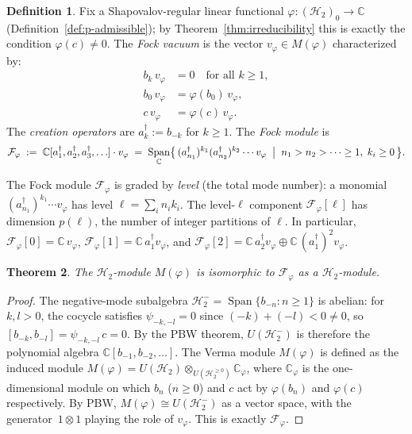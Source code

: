 \documentclass[12pt]{amsart}
\theoremstyle{plain}
\newtheorem{theorem}{Theorem}[section]
\theoremstyle{definition}
\newtheorem{definition}[theorem]{Definition}
\newcommand{\CC}{\mathbb{C}}
\newcommand{\Mf}{M(\varphi)}          %
\newcommand{\vf}{v_\varphi}           %
\DeclareMathOperator{\Span}{Span}
\begin{document}
\begin{definition}
\label{def:fock-vacuum}
Fix a Shapovalov-regular linear functional
$\varphi\colon (\mathcal{H}_2)_0 \to \CC$
(Definition~\ref{def:p-admissible}); by
Theorem~\ref{thm:irreducibility} this is exactly the condition
$\varphi(c)\neq 0$.
The \emph{Fock vacuum} is the vector $\vf \in \Mf$ characterized by:
\begin{align}
  b_k\, \vf &= 0 \quad \text{for all } k \geq 1, \label{eq:fock-annihilate} \\
  b_0\, \vf &= \varphi(b_0)\,\vf, \label{eq:fock-zero-mode} \\
  c\, \vf   &= \varphi(c)\,\vf. \label{eq:fock-central}
\end{align}
The \emph{creation operators} are $a_k^\dagger := b_{-k}$ for $k \geq 1$.
The \emph{Fock module} is
\[
  \mathcal{F}_\varphi
  \;:=\;
  \CC[a_1^\dagger, a_2^\dagger, a_3^\dagger, \ldots]\cdot \vf
  \;=\;
  \Span_\CC\bigl\{\, (a_{n_1}^\dagger)^{k_1}(a_{n_2}^\dagger)^{k_2}
  \cdots \vf
  \;\bigm|\;
  n_1 > n_2 > \cdots \geq 1,\; k_i \geq 0 \,\bigr\}.
\]
\end{definition}

The Fock module $\mathcal{F}_\varphi$ is graded by \emph{level}
(the total mode number): a monomial
$(a_{n_1}^\dagger)^{k_1}\cdots \vf$ has level $\ell = \sum_i n_i k_i$.
The level-$\ell$ component $\mathcal{F}_\varphi[\ell]$ has dimension $p(\ell)$,
the number of integer partitions of $\ell$.
In particular, $\mathcal{F}_\varphi[0] = \CC\,\vf$,
$\mathcal{F}_\varphi[1] = \CC\, a_1^\dagger \vf$, and
$\mathcal{F}_\varphi[2] = \CC\, a_2^\dagger \vf \oplus \CC\, (a_1^\dagger)^2 \vf$.

\begin{theorem}
\label{thm:fock-iso}
The $\mathcal{H}_2$-module $\Mf$ is isomorphic to $\mathcal{F}_\varphi$
as a $\mathcal{H}_2$-module.
\end{theorem}
\begin{proof}
The negative-mode subalgebra $\mathcal{H}_2^- = \Span\{b_{-n} : n \geq 1\}$
is abelian: for $k, l > 0$, the cocycle satisfies $\psi_{-k,-l} = 0$
since $(-k)+(-l) < 0 \neq 0$, so $[b_{-k}, b_{-l}] = \psi_{-k,-l}\,c = 0$.
By the PBW theorem, $U(\mathcal{H}_2^-)$ is therefore the polynomial algebra
$\CC[b_{-1}, b_{-2}, \ldots]$.
The Verma module $\Mf$ is defined as the induced module
$\Mf = U(\mathcal{H}_2) \otimes_{U(\mathcal{H}_2^{\geq 0})} \CC_\varphi$,
where $\CC_\varphi$ is the one-dimensional module on which
$b_n$ ($n \geq 0$) and $c$ act by $\varphi(b_n)$ and $\varphi(c)$ respectively.
By PBW, $\Mf \cong U(\mathcal{H}_2^-)$ as a vector space, with
the generator~$1 \otimes 1$ playing the role of $\vf$.
This is exactly $\mathcal{F}_\varphi$.
\end{proof}
\end{document}
